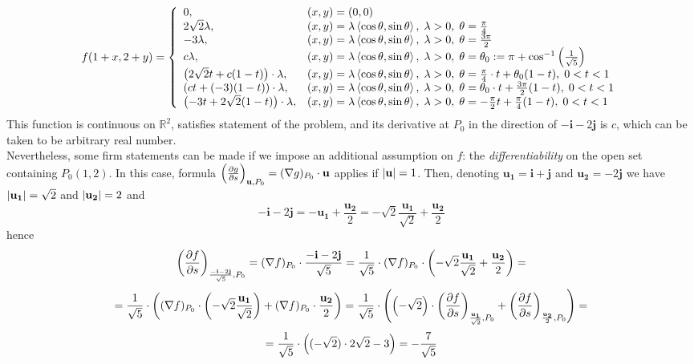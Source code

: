 \documentclass[8pt]{article} %
\begin{document}
\begin{description}
{		\[f(1+x,2+y)=\left\{\begin{array}{ll}
			0, &(x,y)=(0,0)\\
			2\sqrt{2}\lambda, &(x,y)=\lambda\left<\cos\theta,\sin\theta\right>,\;\lambda> 0,\;\theta=\frac{\pi}{4}\\
			-3\lambda, &(x,y)=\lambda\left<\cos\theta,\sin\theta\right>,\;\lambda>0,\;\theta=\frac{3\pi}{2}\\
			c\lambda, &(x,y)=\lambda\left<\cos\theta,\sin\theta\right>,\;\lambda>0,\;\theta=\theta_0:=
			\pi+\cos^{-1}\left(\frac{1}{\sqrt{5}}\right)\\
			\left(2\sqrt{2}t+c(1-t)\right)\cdot\lambda, &(x,y)=\lambda\left<\cos\theta,\sin\theta\right>,\;\lambda> 0,\;
			\theta=\frac{\pi}{4}\cdot t+\theta_0(1-t),\;0<t<1\\
			\left(ct+(-3)(1-t)\right)\cdot\lambda, &(x,y)=\lambda\left<\cos\theta,\sin\theta\right>,\;\lambda> 0,\;
			\theta=\theta_0\cdot t+\frac{3\pi}{2}(1-t),\;0<t<1\\
			\left(-3t+2\sqrt{2}(1-t)\right)\cdot\lambda, &(x,y)=\lambda\left<\cos\theta,\sin\theta\right>,\;\lambda> 0,\;
			\theta=-\frac{\pi}{2}t+\frac{\pi}{4}(1-t),\;0<t<1
		\end{array}\right.\]
		This function is continuous on $\mathbb{R}^2$, satisfies statement of the problem, and its derivative at $P_0$ in the direction
		of $-\mathbf{i}-2\mathbf{j}$ is $c$, which can be taken to be arbitrary real number.\\
		Nevertheless, some firm statements can be made if we impose an additional assumption on $f$: the \textit{differentiability} on
		the open set containing $P_0(1,2)$. In this case, formula
		$\left(\frac{\partial g}{\partial s}\right)_{\mathbf{u},P_0}=(\nabla g)_{P_0}\cdot\mathbf{u}$ applies if $\left|\mathbf{u}\right|=1$. Then,
		denoting $\mathbf{u_1}=\mathbf{i}+\mathbf{j}$ and $\mathbf{u_2}=-2\mathbf{j}$ we have $\left|\mathbf{u_1}\right|=\sqrt{2}$ and
		$\left|\mathbf{u_2}\right|=2$ and
		\[-\mathbf{i}-2\mathbf{j}=-\mathbf{u_1}+\frac{\mathbf{u_2}}{2}=-\sqrt{2}\frac{\mathbf{u_1}}{\sqrt{2}}+\frac{\mathbf{u_2}}{2}\]
		hence
		\[\left(\frac{\partial f}{\partial s}\right)_{\frac{-\mathbf{i}-2\mathbf{j}}{\sqrt{5}},P_0}=(\nabla f)_{P_0}\cdot
		\frac{-\mathbf{i}-2\mathbf{j}}{\sqrt{5}}=\frac{1}{\sqrt{5}}\cdot(\nabla f)_{P_0}\cdot\left(-\sqrt{2}\frac{\mathbf{u_1}}
		{\sqrt{2}}+\frac{\mathbf{u_2}}{2}\right)=\]
		\[=\frac{1}{\sqrt{5}}\cdot\left((\nabla f)_{P_0}\cdot\left(-\sqrt{2}\frac{\mathbf{u_1}}
		{\sqrt{2}}\right)
		+(\nabla f)_{P_0}\cdot\frac{\mathbf{u_2}}{2}\right)=\frac{1}{\sqrt{5}}\cdot\left(\left(-\sqrt{2}\right)\cdot
		\left(\frac{\partial f}{\partial s}\right)_{\frac{\mathbf{u_1}}{\sqrt{2}},P_0}+
		\left(\frac{\partial f}{\partial s}\right)_{\frac{\mathbf{u_2}}{2},P_0}
		\right)=\]
		\[=\frac{1}{\sqrt{5}}\cdot\left((-\sqrt{2})\cdot2\sqrt{2}-3\right)=-\frac{7}{\sqrt{5}}\]
		}

\end{description}
\end{document}
